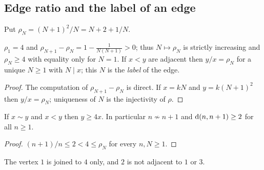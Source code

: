 \subsection{Edge ratio and the label of an edge}
Put $\rho_N=(N+1)^2/N=N+2+1/N$.
\begin{lemma}\label{lem:ratio}
$\rho_1=4$ and $\rho_{N+1}-\rho_N=1-\frac1{N(N+1)}>0$; thus $N\mapsto\rho_N$ is strictly increasing and $\rho_N\ge4$ with equality only for $N=1$. If $x<y$ are adjacent then $y/x=\rho_N$ for a unique $N\ge1$ with $N\mid x$; this $N$ is the \emph{label} of the edge.
\end{lemma}
\begin{proof} The computation of $\rho_{N+1}-\rho_N$ is direct. If $x=kN$ and $y=k(N+1)^2$ then $y/x=\rho_N$; uniqueness of $N$ is the injectivity of $\rho$. \end{proof}
\begin{corollary}\label{cor:nonadj}
If $x\sim y$ and $x<y$ then $y\ge4x$. In particular $n\not\sim n+1$ and $\operatorname{d}(n,n+1)\ge2$ for all $n\ge1$.
\end{corollary}
\begin{proof} $(n+1)/n\le2<4\le\rho_N$ for every $n,N\ge1$. \end{proof}
The vertex $1$ is joined to $4$ only, and $2$ is not adjacent to $1$ or $3$.

